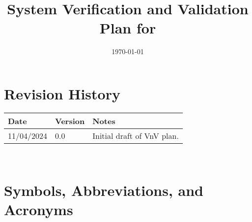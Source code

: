 \documentclass[12pt, titlepage]{article}
\begin{document}
\title{System Verification and Validation Plan for \progname{}} 
\author{\authname}
\date{\today}
	
\maketitle


\section*{Revision History}

\begin{tabularx}{\textwidth}{p{3cm}p{2cm}X}
\toprule {\bf Date} & {\bf Version} & {\bf Notes}\\
\midrule
11/04/2024 & 0.0 & Initial draft of VnV plan.\\
\bottomrule
\end{tabularx}

~\\


\newpage

\tableofcontents

\listoftables



\newpage

\section{Symbols, Abbreviations, and Acronyms}
\end{document}
